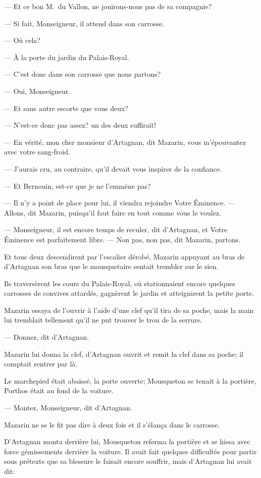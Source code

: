 — Et ce bon M.~du Vallon, ne jouirons-nous pas de sa compagnie?

— Si fait, Monseigneur, il attend dans son carrosse.

— Où cela?

— À la porte du jardin du Palais-Royal.

— C'est donc dans son carrosse que nous partons?

— Oui, Monseigneur.

— Et sans autre escorte que vous deux?

— N'est-ce donc pas assez? un des deux suffirait!

— En vérité, mon cher monsieur d'Artagnan, dit Mazarin, vous m'épouvantez avec votre sang-froid.

— J'aurais cru, au contraire, qu'il devait vous inspirer de la confiance.

— Et Bernouin, est-ce que je ne l'emmène pas?

— Il n'y a point de place pour lui, il viendra rejoindre Votre Éminence.
— Allons, dit Mazarin, puisqu'il faut faire en tout comme vous le voulez.

— Monseigneur, il est encore temps de reculer, dit d'Artagnan, et Votre Éminence est parfaitement libre.
— Non pas, non pas, dit Mazarin, partons.

Et tous deux descendirent par l'escalier dérobé, Mazarin appuyant au bras de d'Artagnan son bras que le mousquetaire sentait trembler sur le sien.

Ils traversèrent les cours du Palais-Royal, où stationnaient encore quelques carrosses de convives attardés, gagnèrent le jardin et atteignirent la petite porte.

Mazarin essaya de l'ouvrir à l'aide d'une clef qu'il tira de sa poche, mais la main lui tremblait tellement qu'il ne put trouver le trou de la serrure.

— Donnez, dit d'Artagnan.

Mazarin lui donna la clef, d'Artagnan ouvrit et remit la clef dans sa poche; il comptait rentrer par là.

Le marchepied était abaissé, la porte ouverte; Mousqueton se tenait à la portière, Porthos était au fond de la voiture.

— Montez, Monseigneur, dit d'Artagnan.

Mazarin ne se le fit pas dire à deux fois et il s'élança dans le carrosse.

D'Artagnan monta derrière lui, Mousqueton referma la portière et se hissa avec force gémissements derrière la voiture. Il avait fait quelques difficultés pour partir sous prétexte que sa blessure le faisait encore souffrir, mais d'Artagnan lui avait dit:

